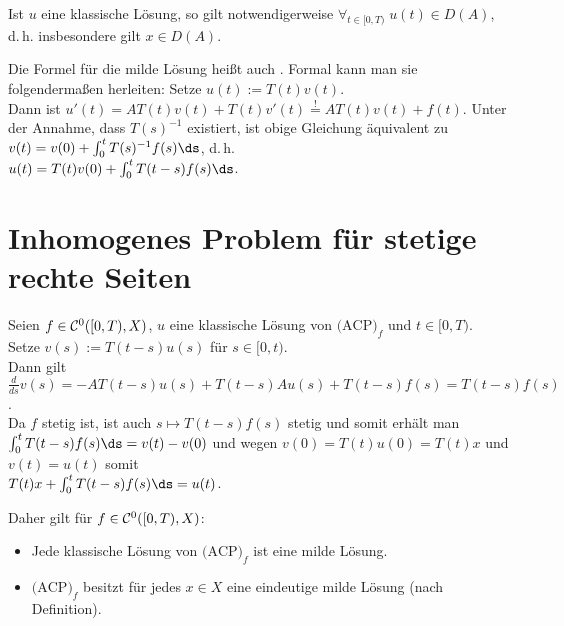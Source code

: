 \begin{Bem}
    Ist $u$ eine klassische Lösung, so gilt notwendigerweise
    $\forall_{t \in [0, T)}\; u(t) \in D(A)$, d.\,h. insbesondere gilt $x \in D(A)$.
\end{Bem}

\linie

\begin{Bem}
    Die Formel für die milde Lösung heißt auch .
    Formal kann man sie folgendermaßen herleiten:
    Setze $u(t) := T(t) v(t)$.\\
    Dann ist $u'(t) = AT(t)v(t) + T(t)v'(t) \overset{!}{=} AT(t)v(t) + f(t)$.
    Unter der Annahme, dass $T(s)^{-1}$ existiert, ist obige Gleichung äquivalent zu
    $v(t) = v(0) + \int_0^t T(s)^{-1} f(s)\ds$, d.\,h.\\
    $u(t) = T(t) v(0) + \int_0^t T(t - s) f(s)\ds$.
\end{Bem}

\pagebreak

\section{%
    Inhomogenes Problem für stetige rechte Seiten
}

\begin{Bem}
    Seien $f \in \mathcal{C}^0([0, T), X)$, $u$ eine klassische Lösung von $\text{(ACP)}_f$
    und $t \in [0, T)$.\\
    Setze $v(s) := T(t - s) u(s)$ für $s \in [0, t)$.\\
    Dann gilt $\frac{d}{ds} v(s) = -AT(t - s) u(s) + T(t - s) Au(s) + T(t - s) f(s) =
    T(t - s) f(s)$.\\
    Da $f$ stetig ist, ist auch $s \mapsto T(t - s) f(s)$ stetig und somit erhält man\\
    $\int_0^t T(t - s) f(s) \ds = v(t) - v(0)$ und wegen $v(0) = T(t)u(0) = T(t)x$ und $v(t) = u(t)$
    somit\\
    $T(t)x + \int_0^t T(t - s) f(s) \ds = u(t)$.

    Daher gilt für $f \in \mathcal{C}^0([0, T), X)$:
    \begin{itemize}
        \item
        Jede klassische Lösung von $\text{(ACP)}_f$ ist eine milde Lösung.

        \item
        $\text{(ACP)}_f$ besitzt für jedes $x \in X$ eine eindeutige milde Lösung
        (nach Definition).
    \end{itemize}
\end{Bem}

